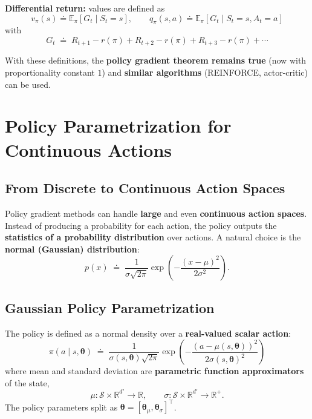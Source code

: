 \documentclass[11pt,a4paper]{article}
\theoremstyle{definition}
\theoremstyle{plain}
\theoremstyle{remark}
\begin{document}
\textbf{Differential return:} values are defined as
\[
    v_\pi(s) \doteq \mathbb{E}_\pi[G_t \mid S_t = s], \qquad q_\pi(s, a) \doteq \mathbb{E}_\pi[G_t \mid S_t = s, A_t = a]
\]
with
\[
    G_t \;\doteq\; R_{t+1} - r(\pi) + R_{t+2} - r(\pi) + R_{t+3} - r(\pi) + \cdots
\]

\begin{tcolorbox}[colback=green!5!white, colframe=green!60!black, title={Continuing Case}]
With these definitions, the \textbf{policy gradient theorem remains true} (now with proportionality constant $1$) and \textbf{similar algorithms} (REINFORCE, actor-critic) can be used.
\end{tcolorbox}

\section{Policy Parametrization for Continuous Actions}

\subsection{From Discrete to Continuous Action Spaces}

Policy gradient methods can handle \textbf{large} and even \textbf{continuous action spaces}. Instead of producing a probability for each action, the policy outputs the \textbf{statistics of a probability distribution} over actions. A natural choice is the \textbf{normal (Gaussian) distribution}:
\[
    p(x) \;\doteq\; \frac{1}{\sigma \sqrt{2\pi}} \exp\!\left(-\frac{(x - \mu)^2}{2\sigma^2}\right).
\]

\subsection{Gaussian Policy Parametrization}

The policy is defined as a normal density over a \textbf{real-valued scalar action}:
\[
    \boxed{\;\pi(a \mid s, \boldsymbol{\theta}) \;\doteq\; \frac{1}{\sigma(s, \boldsymbol{\theta}) \sqrt{2\pi}} \exp\!\left(-\frac{(a - \mu(s, \boldsymbol{\theta}))^2}{2\sigma(s, \boldsymbol{\theta})^2}\right)\;}
\]
where mean and standard deviation are \textbf{parametric function approximators} of the state,
\[
    \mu : \mathcal{S} \times \mathbb{R}^{d'} \to \mathbb{R}, \qquad \sigma : \mathcal{S} \times \mathbb{R}^{d'} \to \mathbb{R}^+.
\]
The policy parameters split as $\boldsymbol{\theta} = [\boldsymbol{\theta}_\mu, \boldsymbol{\theta}_\sigma]^\top$.
\end{document}
